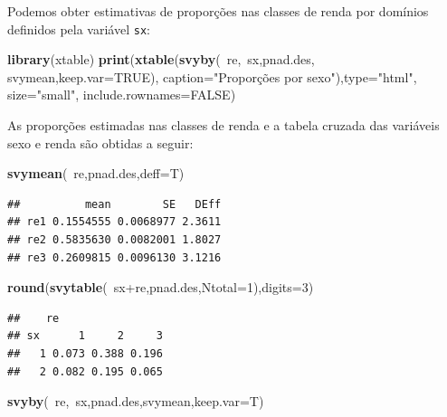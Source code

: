 \documentclass[]{book}
\newenvironment{Shaded}{\begin{snugshade}}{\end{snugshade}}
\newcommand{\KeywordTok}[1]{\textcolor[rgb]{0.13,0.29,0.53}{\textbf{{#1}}}}
\newcommand{\DataTypeTok}[1]{\textcolor[rgb]{0.13,0.29,0.53}{{#1}}}
\newcommand{\DecValTok}[1]{\textcolor[rgb]{0.00,0.00,0.81}{{#1}}}
\newcommand{\StringTok}[1]{\textcolor[rgb]{0.31,0.60,0.02}{{#1}}}
\newcommand{\OtherTok}[1]{\textcolor[rgb]{0.56,0.35,0.01}{{#1}}}
\newcommand{\NormalTok}[1]{{#1}}
\numberwithin{example}{chapter}
\numberwithin{remark}{chapter}
\numberwithin{definition}{chapter}
\begin{document}
Podemos obter estimativas de proporções nas classes de renda por
domínios definidos pela variável \texttt{sx}:

\begin{Shaded}
\begin{Highlighting}[]
\KeywordTok{library}\NormalTok{(xtable)}
\KeywordTok{print}\NormalTok{(}\KeywordTok{xtable}\NormalTok{(}\KeywordTok{svyby}\NormalTok{(~re,~sx,pnad.des, svymean,}\DataTypeTok{keep.var=}\OtherTok{TRUE}\NormalTok{), }\DataTypeTok{caption=}\StringTok{"Proporções por sexo"}\NormalTok{),}\DataTypeTok{type=}\StringTok{"html"}\NormalTok{, }\DataTypeTok{size=}\StringTok{"small"}\NormalTok{, }\DataTypeTok{include.rownames=}\OtherTok{FALSE}\NormalTok{)}
\end{Highlighting}
\end{Shaded}

As proporções estimadas nas classes de renda e a tabela cruzada das
variáveis sexo e renda são obtidas a seguir:

\begin{Shaded}
\begin{Highlighting}[]
\KeywordTok{svymean}\NormalTok{(~re,pnad.des,}\DataTypeTok{deff=}\NormalTok{T)}
\end{Highlighting}
\end{Shaded}

\begin{verbatim}
##          mean        SE   DEff
## re1 0.1554555 0.0068977 2.3611
## re2 0.5835630 0.0082001 1.8027
## re3 0.2609815 0.0096130 3.1216
\end{verbatim}

\begin{Shaded}
\begin{Highlighting}[]
\KeywordTok{round}\NormalTok{(}\KeywordTok{svytable}\NormalTok{(~sx+re,pnad.des,}\DataTypeTok{Ntotal=}\DecValTok{1}\NormalTok{),}\DataTypeTok{digits=}\DecValTok{3}\NormalTok{)}
\end{Highlighting}
\end{Shaded}

\begin{verbatim}
##    re
## sx      1     2     3
##   1 0.073 0.388 0.196
##   2 0.082 0.195 0.065
\end{verbatim}

\begin{Shaded}
\begin{Highlighting}[]
\KeywordTok{svyby}\NormalTok{(~re,~sx,pnad.des,svymean,}\DataTypeTok{keep.var=}\NormalTok{T)}
\end{Highlighting}
\end{Shaded}
\end{document}

